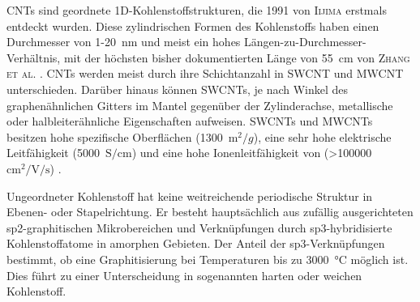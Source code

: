 CNTs sind geordnete 1D-Kohlenstoffstrukturen, die 1991 von \textsc{Iijima} \cite{Iijima1991} erstmals entdeckt wurden. Diese zylindrischen Formen des Kohlenstoffs haben einen Durchmesser von 1-20~$\si{\nano\metre}$ und meist ein hohes Längen-zu-Durchmesser-Verhältnis, mit der höchsten bisher dokumentierten Länge von 55~$\si{\centi\metre}$ von \textsc{Zhang et al.} \cite{Zhang2013}. CNTs werden meist durch ihre Schichtanzahl in SWCNT und MWCNT unterschieden. Darüber hinaus können SWCNTs, je nach Winkel des graphenähnlichen Gitters im Mantel gegenüber der Zylinderachse, metallische oder halbleiterähnliche Eigenschaften aufweisen. 
SWCNTs und MWCNTs besitzen hohe spezifische Oberflächen (1300~$\si{\m^2\per g}$), eine sehr hohe elektrische Leitfähigkeit (5000~$\si{\siemens \per \cm}$) und eine hohe Ionenleitfähigkeit von (>100000~$\si{\cm \squared \per \V \per \s}$) \cite{Xu2011,Uetani2014,Charlier2007}.

Ungeordneter Kohlenstoff hat keine weitreichende periodische Struktur in Ebenen- oder Stapelrichtung. Er besteht hauptsächlich aus zufällig ausgerichteten sp2-graphitischen Mikrobereichen und Verknüpfungen durch sp3-hybridisierte Kohlenstoffatome in amorphen Gebieten. Der Anteil der sp3-Verknüpfungen bestimmt, ob eine Graphitisierung bei Temperaturen bis zu 3000~$\si{\degreeCelsius}$ möglich ist. Dies führt zu einer Unterscheidung in sogenannten harten oder weichen Kohlenstoff.


